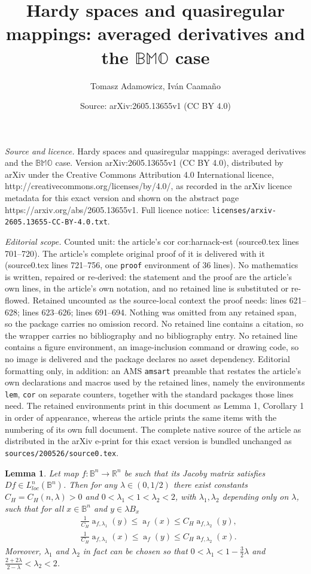 \documentclass[10pt,a4paper]{amsart}
\title{Hardy spaces and quasiregular mappings: averaged derivatives and the $\mathbb{BMO}$ case}
\author{Tomasz Adamowicz, Iv\'an Caama\~no}
\date{Source: arXiv:2605.13655v1 (CC BY 4.0)}
\newtheorem{lem}{Lemma}
\newcommand{\B}{\mathbb{B}^n}
\newcommand{\R}{\mathbb{R}}
\renewcommand{\a}{\operatorname{a}}
\begin{document}
\maketitle

\noindent\emph{Source and licence.} Hardy spaces and quasiregular mappings: averaged derivatives and the $\mathbb{BMO}$ case. Version arXiv:2605.13655v1 (CC BY 4.0), distributed by arXiv under the Creative Commons Attribution 4.0 International licence, http://creativecommons.org/licenses/by/4.0/, as recorded in the arXiv licence metadata for this exact version and shown on the abstract page https://arxiv.org/abs/2605.13655v1. Full licence notice: \texttt{licenses/arxiv-2605.13655-CC-BY-4.0.txt}.\par\smallskip

\noindent\textit{Editorial scope.} Counted unit: the article's cor cor:harnack-est (source0.tex lines 701--720). The article's complete original proof of it is delivered with it (source0.tex lines 721--756, one \texttt{proof} environment of 36 lines). No mathematics is written, repaired or re-derived: the statement and the proof are the article's own lines, in the article's own notation, and no retained line is substituted or re-flowed.  Retained uncounted as the source-local context the proof needs: lines 621--628; lines 623--626; lines 691--694.  Nothing was omitted from any retained span, so the package carries no omission record.  No retained line contains a citation, so the wrapper carries no bibliography and no bibliography entry.  No retained line contains a figure environment, an image-inclusion command or drawing code, so no image is delivered and the package declares no asset dependency.  Editorial formatting only, in addition: an AMS \texttt{amsart} preamble that restates the article's own declarations and macros used by the retained lines, namely the environments \texttt{lem}, \texttt{cor} on separate counters, together with the standard packages those lines need.  The retained environments print in this document as Lemma 1, Corollary 1 in order of appearance, whereas the article prints the same items with the numbering of its own full document.  The complete native source of the article as distributed in the arXiv e-print for this exact version is bundled unchanged as \texttt{sources/200526/source0.tex}.
\begin{lem}\label{lem:harnack}
	Let map $f:\B\rightarrow \R^n$ be such that its Jacoby matrix satisfies ${D\!f \in L^n_{loc}(\B)}$. Then for any $\lambda \in (0,1/2 )$ there exist constants $C_H=C_H(n, \lambda)>0$ and $0<\lambda_1<1<\lambda_2<2$, with $\lambda_1, \lambda_2$ depending only on $\lambda$, such that for all $x\in\B$ and $y\in\lambda B_x$
	\begin{align}
		& \frac{1}{C_H} \a_{f,\lambda_1}(y)\leq \a_f(x)\leq C_H\a_{f,\lambda_2}(y), \label{est1-harnack}\\
		& \frac{1}{C_H} \a_{f,\lambda_1}(x)\leq \a_f(y)\leq C_H\a_{f,\lambda_2}(x). \label{est2-harnack}
	\end{align}
Moreover, $\lambda_1$ and $\lambda_2$ in fact can be chosen so that $0<\lambda_1<1-\frac32\lambda$ and $\frac{2+2\lambda}{2-\lambda}<\lambda_2<2$.
\end{lem}
\end{document}
